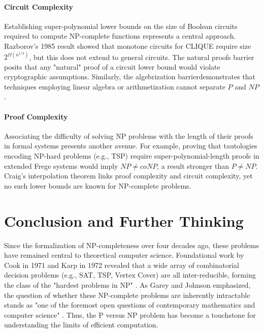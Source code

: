\documentclass[acmsmall]{acmart}
\begin{document}
	\paragraph{\textbf{Circuit Complexity}}
	
	\hspace{0.7em}Establishing super-polynomial lower bounds on the size of Boolean circuits required to compute NP-complete functions represents a central approach. Razborov's 1985 result showed that monotone circuits for CLIQUE require size \( 2^{\Omega(n^{1/4})} \), but this does not extend to general circuits. The natural proofs barrier posits that any "natural" proof of a circuit lower bound would violate cryptographic assumptions. Similarly, the algebrization barrier\cite{Scott2009Algebrization}demonstrates that techniques employing linear algebra or arithmetization cannot separate \( P \) and \( NP \).
	
	\paragraph{\textbf{Proof Complexity}}
	
	\hspace{0.7em}Associating the difficulty of solving NP problems with the length of their proofs in formal systems presents another avenue. For example, proving that tautologies encoding NP-hard problems (e.g., TSP) require super-polynomial-length proofs in extended Frege systems would imply \( NP \neq coNP \), a result stronger than \( P \neq NP \). Craig's interpolation theorem links proof complexity and circuit complexity, yet no such lower bounds are known for NP-complete problems.
	
	\section{Conclusion and Further Thinking}
	
	Since the formalization of NP-completeness over four decades ago, these problems have remained central to theoretical computer science. Foundational work by Cook in 1971 and Karp in 1972 revealed that a wide array of combinatorial decision problems (e.g., SAT, TSP, Vertex Cover) are all inter-reducible, forming the class of the "hardest problems in NP" \cite{karp1972reducibility}. As Garey and Johnson emphasized, the question of whether these NP-complete problems are inherently intractable stands as "one of the foremost open questions of contemporary mathematics and computer science" \cite{garey1979computers}. Thus, the P versus NP problem has become a touchstone for understanding the limits of efficient computation.
	
\end{document}
